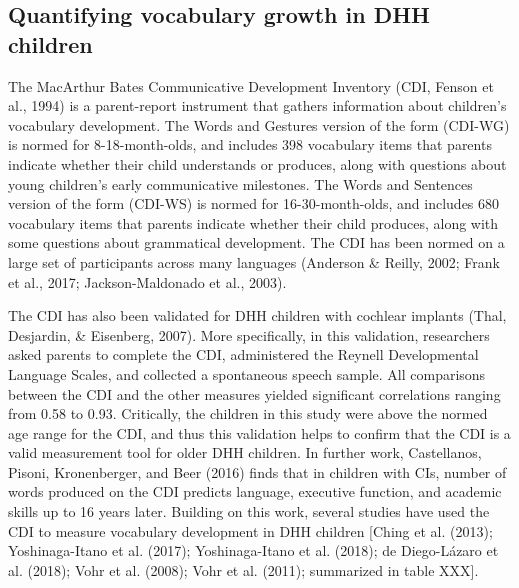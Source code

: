 \documentclass[english,man]{apa6}
\begin{document}
\hypertarget{quantifying-vocabulary-growth-in-dhh-children}{%
\subsection{Quantifying vocabulary growth in DHH children}\label{quantifying-vocabulary-growth-in-dhh-children}}

The MacArthur Bates Communicative Development Inventory (CDI, Fenson et al., 1994) is a parent-report instrument that gathers information about children's vocabulary development. The Words and Gestures version of the form (CDI-WG) is normed for 8-18-month-olds, and includes 398 vocabulary items that parents indicate whether their child understands or produces, along with questions about young children's early communicative milestones. The Words and Sentences version of the form (CDI-WS) is normed for 16-30-month-olds, and includes 680 vocabulary items that parents indicate whether their child produces, along with some questions about grammatical development. The CDI has been normed on a large set of participants across many languages (Anderson \& Reilly, 2002; Frank et al., 2017; Jackson-Maldonado et al., 2003).

The CDI has also been validated for DHH children with cochlear implants (Thal, Desjardin, \& Eisenberg, 2007). More specifically, in this validation, researchers asked parents to complete the CDI, administered the Reynell Developmental Language Scales, and collected a spontaneous speech sample. All comparisons between the CDI and the other measures yielded significant correlations ranging from 0.58 to 0.93. Critically, the children in this study were above the normed age range for the CDI, and thus this validation helps to confirm that the CDI is a valid measurement tool for older DHH children. In further work, Castellanos, Pisoni, Kronenberger, and Beer (2016) finds that in children with CIs, number of words produced on the CDI predicts language, executive function, and academic skills up to 16 years later. Building on this work, several studies have used the CDI to measure vocabulary development in DHH children {[}Ching et al. (2013); Yoshinaga-Itano et al. (2017); Yoshinaga-Itano et al. (2018); de Diego-Lázaro et al. (2018); Vohr et al. (2008); Vohr et al. (2011); summarized in table XXX{]}.
\end{document}
